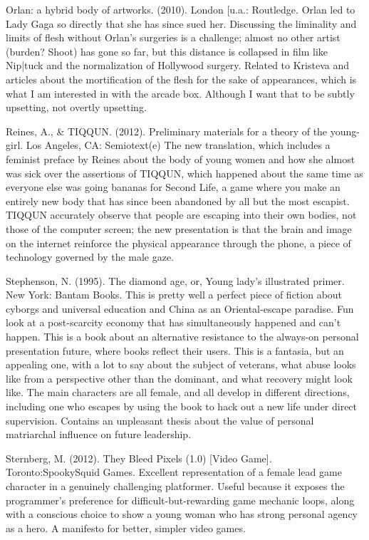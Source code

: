Orlan: a hybrid body of artworks. (2010). London [u.a.: Routledge.
	Orlan led to Lady Gaga so directly that she has since sued her. Discussing the liminality and limits of flesh without Orlan's surgeries is a challenge; almost no other artist (burden? Shoot) has gone so far, but this distance is collapsed in film like Nip|tuck and the normalization of Hollywood surgery. Related to Kristeva and articles about the mortification of the flesh for the sake of appearances, which is what I am interested in with the arcade box. Although I want that to be subtly upsetting, not overtly upsetting.

Reines, A., \& TIQQUN. (2012). Preliminary materials for a theory of the young-girl. Los Angeles, CA: Semiotext(e)
	The new translation, which includes a feminist preface by Reines about the body of young women and how she almost was sick over the assertions of TIQQUN, which happened about the same time as everyone else was going bananas for Second Life, a game where you make an entirely new body that has since been abandoned by all but the most escapist. TIQQUN accurately observe that people are escaping into their own bodies, not those of the computer screen; the new presentation is that the brain and image on the internet reinforce the physical appearance through the phone, a piece of technology governed by the male gaze.


Stephenson, N. (1995). The diamond age, or, Young lady's illustrated primer. New York: Bantam Books.
	This is pretty well a perfect piece of fiction about cyborgs and universal education and China as an Oriental-escape paradise. Fun look at a post-scarcity economy that has simultaneously happened and can't happen. This is a book about an alternative resistance to the always-on personal presentation future, where books reflect their users. This is a fantasia, but an appealing one, with a lot to say about the subject of veterans, what abuse looks like from a perspective other than the dominant, and what recovery might look like. The main characters are all female, and all develop in different directions, including one who escapes by using the book to hack out a new life under direct supervision. Contains an unpleasant thesis about the value of personal matriarchal influence on future leadership.

Sternberg, M. (2012). They Bleed Pixels (1.0) [Video Game]. Toronto:SpookySquid Games.
	Excellent representation of a female lead game character in a genuinely challenging platformer. Useful because it exposes the programmer's preference for difficult-but-rewarding game mechanic loops, along with a conscious choice to show a young woman who has strong personal agency as a hero. A manifesto for better, simpler video games.
	
